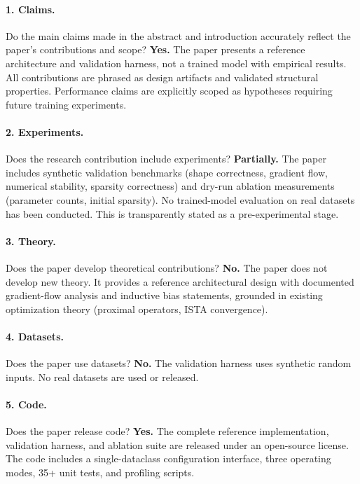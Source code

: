 \documentclass{article}
\begin{document}
\paragraph{1. Claims.}
Do the main claims made in the abstract and introduction accurately reflect
the paper's contributions and scope?
\textbf{Yes.} The paper presents a reference architecture and validation
harness, not a trained model with empirical results. All contributions are
phrased as design artifacts and validated structural properties. Performance
claims are explicitly scoped as hypotheses requiring future training
experiments.

\paragraph{2. Experiments.}
Does the research contribution include experiments?
\textbf{Partially.} The paper includes synthetic validation benchmarks
(shape correctness, gradient flow, numerical stability, sparsity correctness)
and dry-run ablation measurements (parameter counts, initial sparsity).
No trained-model evaluation on real datasets has been conducted. This is
transparently stated as a pre-experimental stage.

\paragraph{3. Theory.}
Does the paper develop theoretical contributions?
\textbf{No.} The paper does not develop new theory. It provides a reference
architectural design with documented gradient-flow analysis and inductive bias
statements, grounded in existing optimization theory (proximal operators, ISTA
convergence).

\paragraph{4. Datasets.}
Does the paper use datasets?
\textbf{No.} The validation harness uses synthetic random inputs. No real
datasets are used or released.

\paragraph{5. Code.}
Does the paper release code?
\textbf{Yes.} The complete reference implementation, validation harness, and
ablation suite are released under an open-source license. The code includes a
single-dataclass configuration interface, three operating modes, 35+ unit
tests, and profiling scripts.
\end{document}
